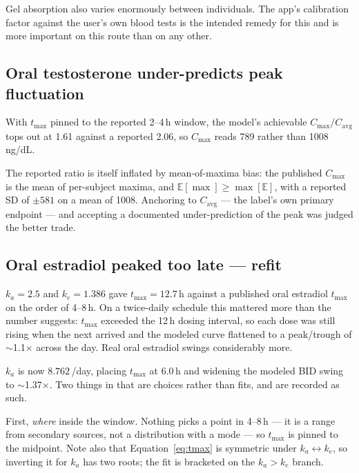 \documentclass[11pt,a4paper]{article}
\begin{document}
Gel absorption also varies enormously between individuals. The app's calibration
factor against the user's own blood tests is the intended remedy for this and is
more important on this route than on any other.

\subsection{Oral testosterone under-predicts peak fluctuation}

With $t_{\max}$ pinned to the reported 2--4\,h window, the model's achievable
$C_{\max}/C_{\mathrm{avg}}$ tops out at 1.61 against a reported 2.06, so
$C_{\max}$ reads 789 rather than 1008\,ng/dL.

The reported ratio is itself inflated by mean-of-maxima bias: the published
$C_{\max}$ is the mean of per-subject maxima, and $\mathbb{E}[\max] \ge
\max[\mathbb{E}]$, with a reported SD of $\pm 581$ on a mean of 1008. Anchoring
to $C_{\mathrm{avg}}$ --- the label's own primary endpoint --- and accepting a
documented under-prediction of the peak was judged the better trade.

\subsection{Oral estradiol peaked too late --- refit}

$k_a = 2.5$ and $k_e = 1.386$ gave $t_{\max} = 12.7$\,h against a published oral
estradiol $t_{\max}$ on the order of 4--8\,h. On a twice-daily schedule this
mattered more than the number suggests: $t_{\max}$ exceeded the 12\,h dosing
interval, so each dose was still rising when the next arrived and the modeled
curve flattened to a peak/trough of $\sim$1.1$\times$ across the day. Real oral
estradiol swings considerably more.

$k_a$ is now $8.762$\,/day, placing $t_{\max}$ at $6.0$\,h and widening the modeled
BID swing to $\sim$1.37$\times$. Two things in that are choices rather than fits,
and are recorded as such.

First, \emph{where} inside the window. Nothing picks a point in 4--8\,h --- it is
a range from secondary sources, not a distribution with a mode --- so $t_{\max}$
is pinned to the midpoint. Note also that Equation~\ref{eq:tmax} is symmetric
under $k_a \leftrightarrow k_e$, so inverting it for $k_a$ has two roots; the fit
is bracketed on the $k_a > k_e$ branch.
\end{document}
